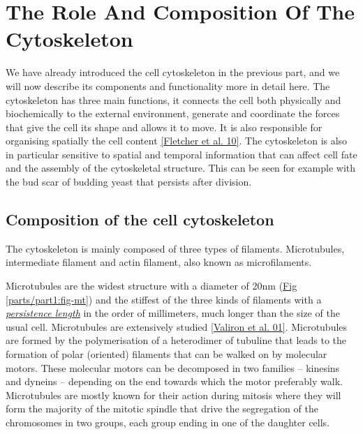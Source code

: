 \documentclass[A4paperpaper,11pt,english]{sphinxmanual}
\begin{document}
\section{The Role And Composition Of The Cytoskeleton}
\label{parts/part1:the-role-and-composition-of-the-cytoskeleton}\label{parts/part1:role-of-actin}
We have already introduced the cell cytoskeleton in the previous part, and we will now
describe its components and functionality more in detail here.  The cytoskeleton
has three main functions, it connects the cell both physically
and biochemically to the external environment, generate and coordinate the
forces that give the cell its shape and allows it to move. It is also
responsible for organising spatially  the cell content {\hyperref[parts/part1:fletcher2010]{{[}Fletcher et al. 10{]}}}.
The cytoskeleton is also in particular sensitive to spatial and temporal
information that can affect cell fate and the assembly of the cytoskeletal
structure. This can be seen for example with the bud scar of budding yeast that
persists after division.


\subsection{Composition of the cell cytoskeleton}
\label{parts/part1:composition-of-the-cell-cytoskeleton}
The cytoskeleton is mainly composed of three types of filaments.
Microtubules, intermediate filament and actin filament, also known as
microfilaments.

Microtubules are the widest structure with a diameter of 20nm (\hyperref[parts/part1:fig-mt]{Fig  \ref*{parts/part1:fig-mt}})
and the
stiffest of the three kinds of filaments with a {\hyperref[parts/part1:viscoelastic]{\emph{persistence length}}} in the order
of millimeters, much longer than the size of the usual cell.
Microtubules are extensively studied {\hyperref[parts/part1:valiron2001]{{[}Valiron et al. 01{]}}}.
Microtubules are formed by the polymerisation of a heterodimer of tubuline
that leads to the formation of polar (oriented) filaments that can be walked on
by molecular motors. These molecular motors can be decomposed in two families –
kinesins and dyneins – depending on the end towards which the motor preferably
walk.  Microtubules are mostly known for their action during mitosis
where they will form the majority of the mitotic spindle that drive the segregation
of the chromosomes in two groups, each group ending in one of the daughter
cells.
\end{document}
